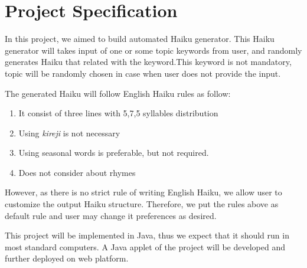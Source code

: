 \section{Project Specification}

In this project, we aimed to build automated Haiku generator. This Haiku generator will takes input of one or some topic keywords from user, and randomly generates Haiku that related with the keyword.This keyword is not mandatory, topic will be randomly chosen in case when user does not provide the input.

The generated Haiku will follow English Haiku rules as follow:
\begin{enumerate}
	\item It consist of three lines with 5,7,5 syllables distribution
	\item Using \textit{kireji} is not necessary
	\item Using seasonal words is preferable, but not required.
	\item Does not consider about rhymes
\end{enumerate}

However, as there is no strict rule of writing English Haiku, we allow user to customize the output Haiku structure. Therefore, we put the rules above as default rule and user may change it preferences as desired. 

This project will be implemented in Java, thus we expect that it should run in most standard computers. A Java applet of the project will be developed and further deployed on web platform. 

